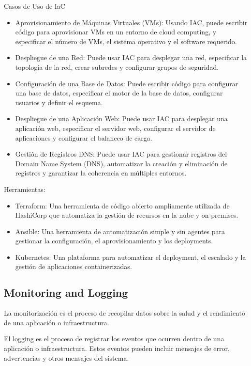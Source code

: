 \documentclass[12pt]{book}
\begin{document}
Casos de Uso de IaC

\begin{itemize}
    \item Aprovisionamiento de Máquinas Virtuales (VMs): Usando IAC, puede escribir código para aprovisionar VMs en un entorno de cloud computing, y especificar el número de VMs, el sistema operativo y el software requerido.
    \item Despliegue de una Red: Puede usar IAC para desplegar una red, especificar la topología de la red, crear subredes y configurar grupos de seguridad.
    \item Configuración de una Base de Datos: Puede escribir código para configurar una base de datos, especificar el motor de la base de datos, configurar usuarios y definir el esquema.
    \item Despliegue de una Aplicación Web: Puede usar IAC para desplegar una aplicación web, especificar el servidor web, configurar el servidor de aplicaciones y configurar el balanceo de carga.
    \item Gestión de Registros DNS: Puede usar IAC para gestionar registros del Domain Name System (DNS), automatizar la creación y eliminación de registros y garantizar la coherencia en múltiples entornos.
\end{itemize}

Herramientas:
\begin{itemize}
    \item Terraform: Una herramienta de código abierto ampliamente utilizada de HashiCorp que automatiza la gestión de recursos en la nube y on-premises.
    \item Ansible: Una herramienta de automatización simple y sin agentes para gestionar la configuración, el aprovisionamiento y los deployments.
  \item Kubernetes: Una plataforma para automatizar el deployment, el escalado y la gestión de aplicaciones containerizadas.
\end{itemize}

\subsection{Monitoring and Logging}
La monitorización es el proceso de recopilar datos sobre la salud y el rendimiento de una aplicación o infraestructura.

El logging es el proceso de registrar los eventos que ocurren dentro de una aplicación o infraestructura. Estos eventos pueden incluir mensajes de error, advertencias y otros mensajes del sistema.
\end{document}

